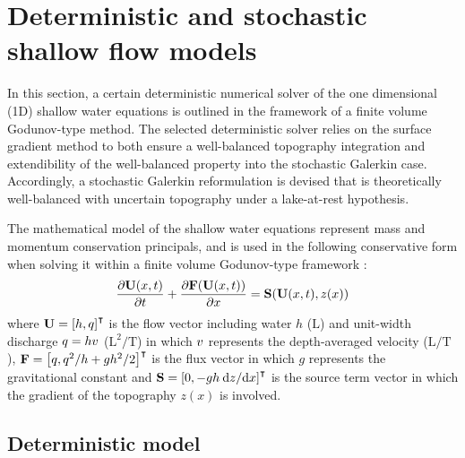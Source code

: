 \section{Deterministic and stochastic shallow flow models}

In this section, a certain deterministic numerical solver of the one dimensional (1D) shallow water equations is outlined in the framework of a finite volume Godunov-type method.
The selected deterministic solver relies on the surface gradient method \citep{zhou2001} to both ensure a well-balanced topography integration and extendibility of the well-balanced property into the stochastic Galerkin case. 
Accordingly, a stochastic Galerkin reformulation is devised that is theoretically well-balanced with uncertain topography under a lake-at-rest hypothesis.

The mathematical model of the shallow water equations represent mass and momentum
conservation principals, and is used in the following conservative form when solving it within a finite volume Godunov-type framework \citep{toro-garcianavarro2007}:
\begin{align}
\frac{\partial \mathbf{U}(x, t)}{\partial t} + \frac{\partial \mathbf{F}(\mathbf{U}(x, t))}{\partial x} = \mathbf{S}(\mathbf{U}(x, t), z(x)) \label{eqn:swe}
\end{align}
where $\mathbf{U} = \left[ h, q \right]^\intercal$ is the flow vector including water  $h$ ($\mathrm{L}$) and unit-width discharge $q = hv$ ($\mathrm{L}^2/\mathrm{T}$) in which $v$ represents the depth-averaged velocity ($\mathrm{L}/\mathrm{T}$), $\mathbf{F} = \left[ q,  q^2/h + gh^2/2 \right]^\intercal$ is the flux vector in which $g$ represents the gravitational constant and $\mathbf{S} = \left[ 0, -gh \: \mathrm{d} z / \mathrm{d} x \right]^\intercal$ is the source term vector in which the gradient of the topography $z(x)$ is involved.

\subsection{Deterministic model}

